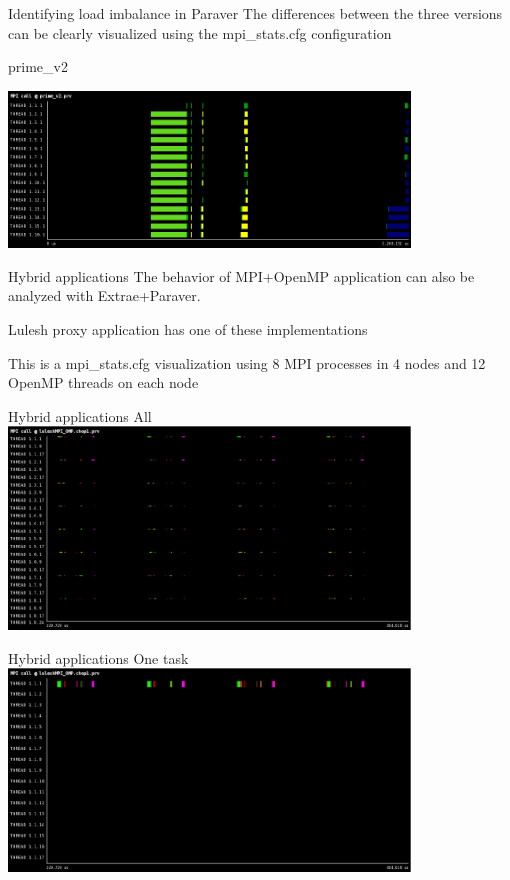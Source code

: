 \documentclass[10pt,xcolor=table]{beamer}
\begin{document}
\begin{frame}{Identifying load imbalance in Paraver}
The differences between the three versions can be clearly visualized using the mpi\_stats.cfg configuration

\centering
prime\_v2

\includegraphics[width=0.8\textwidth]{figs/MPI_call@prime_v2.png}

    
\end{frame}

\begin{frame}{Hybrid applications}
The behavior of MPI+OpenMP application can also be analyzed with Extrae+Paraver.

Lulesh proxy application has one of these implementations

This is a mpi\_stats.cfg visualization using 8 MPI processes in 4 nodes and 12 OpenMP threads on each node

\end{frame}

\begin{frame}{Hybrid applications}
All\\
\includegraphics[width=0.8\textwidth]{figs/MPI_call@luleshMPI_OMP.chop1.eps}
\end{frame}

\begin{frame}{Hybrid applications}
One task\\
\includegraphics[width=0.8\textwidth]{figs/MPI_call@luleshMPI_OMP.chop1onetask.eps}
\end{frame}
\end{document}
